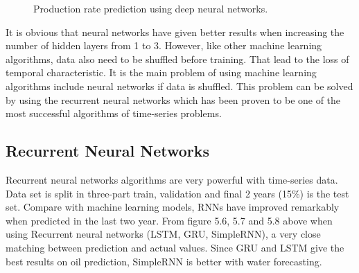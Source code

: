 \documentclass[12pt,a4paper]{report}
\begin{document}
\begin{figure}[H]
     \begin{center}
%
    \end{center}
    \caption{%
        Production rate prediction using deep neural networks.
     }%
   \label{fig:subfigures}
\end{figure}
It is obvious that neural networks have given better results when increasing the number of hidden layers from 1 to 3. However, like other machine learning algorithms, data also need to be shuffled before training. That lead to the loss of temporal characteristic. It is the main problem of using machine learning algorithms include neural networks if data is shuffled. This problem can be solved by using the recurrent neural networks which has been proven to be one of the most successful algorithms of time-series problems.

\subsection{Recurrent Neural Networks}
Recurrent neural networks algorithms are very powerful with time-series data. Data set is split in three-part train, validation and final 2 years (15\%) is the test set. Compare with machine learning models, RNNs have improved remarkably when predicted in the last two year. From figure 5.6, 5.7 and 5.8 above when using Recurrent neural networks (LSTM, GRU, SimpleRNN), a very close matching between prediction and actual values. Since GRU and LSTM give the best results on oil prediction, SimpleRNN is better with water forecasting.
\end{document}
